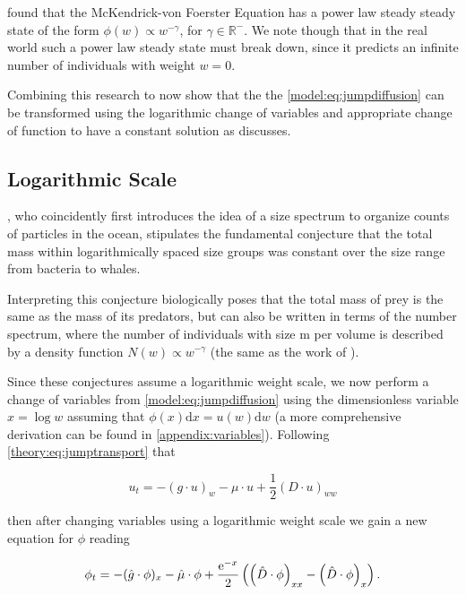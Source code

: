 \documentclass[../main]{subfiles}
\begin{document}
  \cite{benoit2004} found that the McKendrick-von Foerster Equation has a power law steady steady state of the form $\phi(w) \propto w^{-\gamma}$, for $\gamma \in \mathbb{R}^-$. We note though that in the real world such a power law steady state must break down, since it predicts an infinite number of individuals with weight $w = 0$.

  Combining this research to now show that the the \autoref{model:eq:jumpdiffusion} can be transformed using the logarithmic change of variables and appropriate change of function to have a constant solution as \cite{benoit2004} discusses.

  \subsection{Logarithmic Scale}
  \cite{sheldon1967}, who coincidently first introduces the idea of a size spectrum to organize counts of particles in the ocean, stipulates the fundamental conjecture that the total mass within logarithmically spaced size groups was constant over the size range from bacteria to whales.

  Interpreting this conjecture biologically \cite{silvert1980} poses that the total mass of prey is the same as the mass of its predators, but can also be written in terms of the number spectrum, where the number of individuals with size m per volume is described by a density function $N(w) \propto w^{-\gamma}$ (the same as the work of \cite{benoit2004}).

  Since these conjectures assume a logarithmic weight scale, we now perform a change of variables from \autoref{model:eq:jumpdiffusion} using the dimensionless variable $x = \log{w}$ assuming that $\phi(x) \mathrm{d}x = u(w) \mathrm{d}w$ (a more comprehensive derivation can be found in \autoref{appendix:variables}). Following \autoref{theory:eq:jumptransport} that

  \begin{equation}
    u_t = - (g \cdot u)_w - \mu \cdot u + \frac{1}{2} (D \cdot u)_{ww}
  \end{equation}

  then after changing variables using a logarithmic weight scale we gain a new equation for $\phi$ reading

  \begin{equation} \label{model:eq:logscale}
    \phi_t = - (\hat{g} \cdot \phi)_x - \hat{\mu} \cdot \phi + \frac{\operatorname{e}^{-x}}{2} \left( \left( \hat{D} \cdot \phi \right)_{xx} - \left( \hat{D} \cdot \phi \right)_x \right).
  \end{equation}
\end{document}

